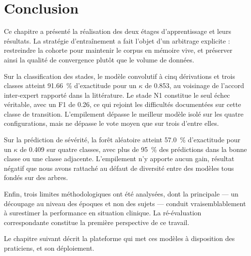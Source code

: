 \section{Conclusion}

Ce chapitre a présenté la réalisation des deux étages d'apprentissage et leurs
résultats. La stratégie d'entraînement a fait l'objet d'un arbitrage explicite :
restreindre la cohorte pour maintenir le corpus en mémoire vive, et préserver ainsi la
qualité de convergence plutôt que le volume de données.

Sur la classification des stades, le modèle convolutif à cinq dérivations et trois
classes atteint \SI{91,66}{\percent} d'exactitude pour un $\kappa$ de \num{0,853},
au voisinage de l'accord inter-expert rapporté dans la littérature. Le stade N1
constitue le seul échec véritable, avec un F1 de \num{0,26}, ce qui rejoint les
difficultés documentées sur cette classe de transition. L'empilement dépasse le
meilleur modèle isolé sur les quatre configurations, mais ne dépasse le vote moyen que
sur trois d'entre elles.

Sur la prédiction de sévérité, la forêt aléatoire atteint \SI{57,0}{\percent}
d'exactitude pour un $\kappa$ de \num{0,409} sur quatre classes, avec plus de
\SI{95}{\percent} des prédictions dans la bonne classe ou une classe adjacente.
L'empilement n'y apporte aucun gain, résultat négatif que nous avons rattaché au
défaut de diversité entre des modèles tous fondés sur des arbres.

Enfin, trois limites méthodologiques ont été analysées, dont la principale — un
découpage au niveau des époques et non des sujets — conduit vraisemblablement à
surestimer la performance en situation clinique. La ré-évaluation correspondante
constitue la première perspective de ce travail.

Le chapitre suivant décrit la plateforme qui met ces modèles à disposition des
praticiens, et son déploiement.
